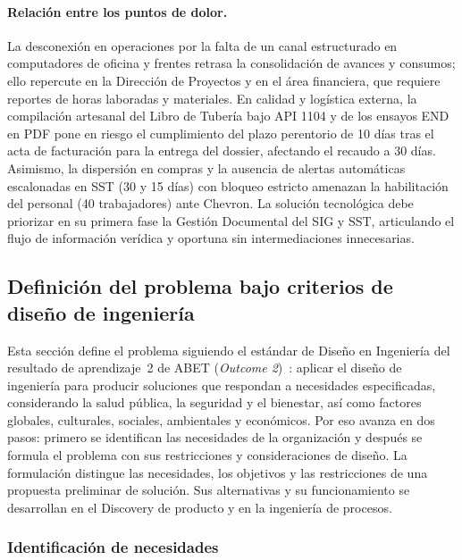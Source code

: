 \documentclass[12pt,letterpaper]{article}
\begin{document}
\paragraph{Relación entre los puntos de dolor.}
La desconexión en operaciones por la falta de un canal estructurado en computadores de oficina y frentes retrasa la consolidación de avances y consumos; ello repercute en la Dirección de Proyectos y en el área financiera, que requiere reportes de horas laboradas y materiales. En calidad y logística externa, la compilación artesanal del Libro de Tubería bajo API 1104 y de los ensayos END en PDF pone en riesgo el cumplimiento del plazo perentorio de 10 días tras el acta de facturación para la entrega del dossier, afectando el recaudo a 30 días. Asimismo, la dispersión en compras y la ausencia de alertas automáticas escalonadas en SST (30 y 15 días) con bloqueo estricto amenazan la habilitación del personal (40 trabajadores) ante Chevron. La solución tecnológica debe priorizar en su primera fase la Gestión Documental del SIG y SST, articulando el flujo de información verídica y oportuna sin intermediaciones innecesarias.

\subsection{Definición del problema bajo criterios de diseño de ingeniería}
Esta sección define el problema siguiendo el estándar de Diseño en Ingeniería del resultado de aprendizaje~2 de ABET (\emph{Outcome 2})~\cite{abet}: aplicar el diseño de ingeniería para producir soluciones que respondan a necesidades especificadas, considerando la salud pública, la seguridad y el bienestar, así como factores globales, culturales, sociales, ambientales y económicos. Por eso avanza en dos pasos: primero se identifican las necesidades de la organización y después se formula el problema con sus restricciones y consideraciones de diseño. La formulación distingue las necesidades, los objetivos y las restricciones de una propuesta preliminar de solución. Sus alternativas y su funcionamiento se desarrollan en el Discovery de producto y en la ingeniería de procesos.

\subsubsection{Identificación de necesidades}
\label{sec:necesidades}
\end{document}
